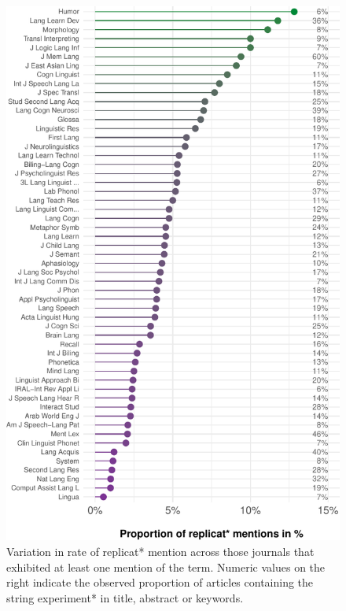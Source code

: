 \documentclass[cm,linguex]{glossa}
\begin{document}
\begin{figure}

{\centering \includegraphics{ReplicationLingGlossa_files/figure-latex/topten-plot-1} 

}

\caption{Variation in rate of replicat* mention across those journals that exhibited at least one mention of the term. Numeric values on the right indicate the observed proportion of articles containing the string experiment* in title, abstract or keywords.}\label{fig:topten-plot}
\end{figure}
\end{document}
